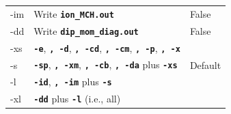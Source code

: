 \documentclass[a4paper,10pt,DIV=15,openany]{scrbook}
\newcommand{\ttt}[1]{\textbf{\texttt{#1}}}
\begin{document}
\begin{table}[h]
\begin{tabular}{>{\ttfamily}lll}
    -im         &Write \ttt{ion\_MCH.out}                               &False                    \\
    -dd         &Write \ttt{dip\_mom\_diag.out}                         &False                    \\
    \hline
    -xs         &\ttt{-e}, \ttt{, -d}, \ttt{, -cd}, \ttt{, -cm}, \ttt{, -p}, \ttt{, -x}        &\\
    -s          &\ttt{-sp}, \ttt{, -xm}, \ttt{, -cb}, \ttt{, -da} plus \ttt{-xs}                &Default\\
    -l          &\ttt{-id}, \ttt{, -im} plus \ttt{-s}                           &\\
    -xl         &\ttt{-dd} plus \ttt{-l} (i.e., all)               &\\
    \hline
  \end{tabular}
\end{table}
\end{document}
